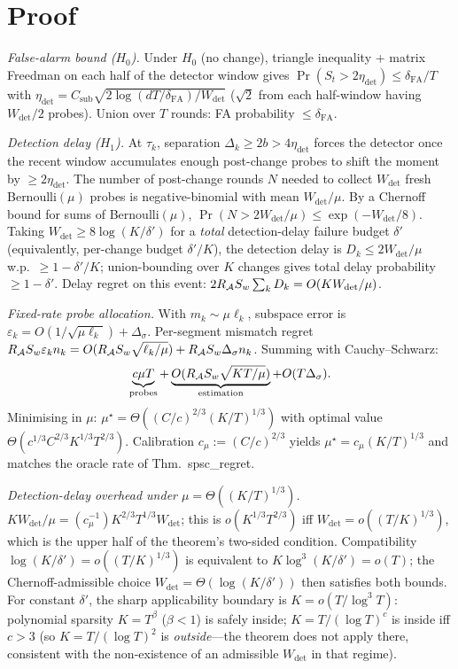 \section*{Proof}

\emph{False-alarm bound ($H_0$).} Under $H_0$ (no change), triangle
inequality + matrix Freedman on each half of the detector window
gives $\Pr(S_t > 2\eta_{\mathrm{det}}) \le \delta_{\mathrm{FA}}/T$ with
$\eta_{\mathrm{det}} = C_{\mathrm{sub}}\sqrt{2\log(dT/\delta_{\mathrm{FA}})/W_{\mathrm{det}}}$
($\sqrt 2$ from each half-window having $W_{\mathrm{det}}/2$ probes).
Union over $T$ rounds: FA probability $\le\delta_{\mathrm{FA}}$.

\emph{Detection delay ($H_1$).} At $\tau_k$, separation
$\Delta_k\ge 2b > 4\eta_{\mathrm{det}}$ forces the detector once the
recent window accumulates enough post-change probes to shift the
moment by $\ge 2\eta_{\mathrm{det}}$. The number of post-change rounds
$N$ needed to collect $W_{\mathrm{det}}$ fresh Bernoulli$(\mu)$ probes is
negative-binomial with mean $W_{\mathrm{det}}/\mu$. By a Chernoff bound
for sums of Bernoulli$(\mu)$,
$\Pr(N>2W_{\mathrm{det}}/\mu)\le\exp(-W_{\mathrm{det}}/8)$. Taking
$W_{\mathrm{det}}\ge 8\log(K/\delta')$ for a \emph{total} detection-delay
failure budget $\delta'$ (equivalently, per-change budget $\delta'/K$),
the detection delay is $D_k\le 2W_{\mathrm{det}}/\mu$ w.p.\ $\ge 1-\delta'/K$;
union-bounding over $K$ changes gives total delay probability $\ge 1-\delta'$. Delay regret on this event:
$2R_{\mathcal{A}} S_w\sum_k D_k = O(KW_{\mathrm{det}}/\mu)$.

\emph{Fixed-rate probe allocation.} With $m_k\sim\mu\ell_k$, subspace
error is $\varepsilon_k=O(1/\sqrt{\mu\ell_k})+\Delta_\sigma$.
Per-segment mismatch regret
$R_{\mathcal{A}} S_w\varepsilon_k n_k = O(R_{\mathcal{A}} S_w\sqrt{\ell_k/\mu})+R_{\mathcal{A}} S_w\Delta_\sigma n_k$.
Summing with Cauchy--Schwarz:
\[
\underbrace{c\mu T}_{\text{probes}}+\underbrace{O(R_{\mathcal{A}} S_w\sqrt{KT/\mu})}_{\text{estimation}}
+O(T\Delta_\sigma).
\]
Minimising in $\mu$: $\mu^\star=\Theta((C/c)^{2/3}(K/T)^{1/3})$ with
optimal value $\Theta(c^{1/3}C^{2/3}K^{1/3}T^{2/3})$. Calibration
$c_\mu:=(C/c)^{2/3}$ yields $\mu^\star=c_\mu(K/T)^{1/3}$ and matches
the oracle rate of Thm.\ spsc\_regret.

\emph{Detection-delay overhead under $\mu=\Theta((K/T)^{1/3})$.}
$KW_{\mathrm{det}}/\mu = (c_\mu^{-1})K^{2/3}T^{1/3}W_{\mathrm{det}}$;
this is $o(K^{1/3}T^{2/3})$ iff $W_{\mathrm{det}}=o((T/K)^{1/3})$,
which is the upper half of the theorem's two-sided condition.
Compatibility $\log(K/\delta')=o((T/K)^{1/3})$ is equivalent to
$K\log^3(K/\delta')=o(T)$; the Chernoff-admissible choice
$W_{\mathrm{det}}=\Theta(\log(K/\delta'))$ then satisfies both
bounds. For constant $\delta'$, the sharp applicability boundary is
$K=o(T/\log^3 T)$: polynomial sparsity $K=T^\beta$ ($\beta<1$) is
safely inside; $K=T/(\log T)^c$ is inside iff $c>3$ (so
$K=T/(\log T)^2$ is \emph{outside}---the theorem does not apply
there, consistent with the non-existence of an admissible
$W_{\mathrm{det}}$ in that regime).

